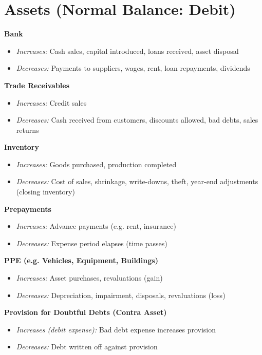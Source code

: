 
\section*{Assets (Normal Balance: Debit)}

\textbf{Bank}
\begin{itemize}
    \item \textit{Increases:} Cash sales, capital introduced, loans received, asset disposal
    \item \textit{Decreases:} Payments to suppliers, wages, rent, loan repayments, dividends
\end{itemize}

\textbf{Trade Receivables}
\begin{itemize}
    \item \textit{Increases:} Credit sales
    \item \textit{Decreases:} Cash received from customers, discounts allowed, bad debts, sales returns
\end{itemize}

\textbf{Inventory}
\begin{itemize}
    \item \textit{Increases:} Goods purchased, production completed
    \item \textit{Decreases:} Cost of sales, shrinkage, write-downs, theft, year-end adjustments (closing inventory)
\end{itemize}

\textbf{Prepayments}
\begin{itemize}
    \item \textit{Increases:} Advance payments (e.g. rent, insurance)
    \item \textit{Decreases:} Expense period elapses (time passes)
\end{itemize}

\textbf{PPE (e.g. Vehicles, Equipment, Buildings)}
\begin{itemize}
    \item \textit{Increases:} Asset purchases, revaluations (gain)
    \item \textit{Decreases:} Depreciation, impairment, disposals, revaluations (loss)
\end{itemize}

\textbf{Provision for Doubtful Debts (Contra Asset)}
\begin{itemize}
    \item \textit{Increases (debit expense):} Bad debt expense increases provision
    \item \textit{Decreases:} Debt written off against provision
\end{itemize}


